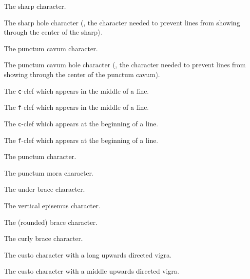 The sharp character.

The sharp hole character (\ie, the character needed to prevent lines from showing through the center of the sharp).

The punctum cavum character.

The punctum cavum hole character (\ie, the character needed to prevent lines from showing through the center of the punctum cavum).

The \texttt{c}-clef which appears in the middle of a line.

The \texttt{f}-clef which appears in the middle of a line.

The \texttt{c}-clef which appears at the beginning of a line.

The \texttt{f}-clef which appears at the beginning of a line.

The punctum character.

The punctum mora character.

The under brace character.

The vertical episemus character.

The (rounded) brace character.

The curly brace character.

The custo character with a long upwards directed vigra.

The custo character with a middle upwards directed vigra.

